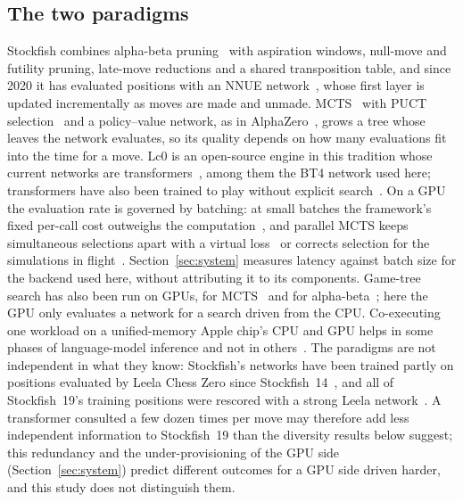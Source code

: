 \documentclass{article}
\begin{document}
\subsection{The two paradigms}
Stockfish combines alpha-beta pruning~\cite{knuth1975} with aspiration windows, null-move and futility pruning, late-move reductions and a shared transposition table, and since 2020 it has evaluated positions with an NNUE network~\cite{nasu2018,sf12}, whose first layer is updated incrementally as moves are made and unmade. MCTS~\cite{coulom2006,kocsis2006,browne2012} with PUCT selection~\cite{rosin2011} and a policy--value network, as in AlphaZero~\cite{silver2018}, grows a tree whose leaves the network evaluates, so its quality depends on how many evaluations fit into the time for a move. Lc0 is an open-source engine in this tradition whose current networks are transformers~\cite{monroe2026,lc0}, among them the BT4 network used here; transformers have also been trained to play without explicit search~\cite{ruoss2024}. On a GPU the evaluation rate is governed by batching: at small batches the framework's fixed per-call cost outweighs the computation~\cite{fernandez2023}, and parallel MCTS keeps simultaneous selections apart with a virtual loss~\cite{chaslot2008} or corrects selection for the simulations in flight~\cite{liu2020wuuct}. Section~\ref{sec:system} measures latency against batch size for the backend used here, without attributing it to its components. Game-tree search has also been run on GPUs, for MCTS~\cite{rocki2011,barriga2014} and for alpha-beta~\cite{strnad2011}; here the GPU only evaluates a network for a search driven from the CPU. Co-executing one workload on a unified-memory Apple chip's CPU and GPU helps in some phases of language-model inference and not in others~\cite{mohite2026}.  The paradigms are not independent in what they know: Stockfish's networks have been trained partly on positions evaluated by Leela Chess Zero since Stockfish~14~\cite{sf14}, and all of Stockfish~19's training positions were rescored with a strong Leela network~\cite{stockfish}. A transformer consulted a few dozen times per move may therefore add less independent information to Stockfish~19 than the diversity results below suggest; this redundancy and the under-provisioning of the GPU side (Section~\ref{sec:system}) predict different outcomes for a GPU side driven harder, and this study does not distinguish them.
\end{document}
